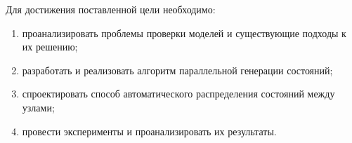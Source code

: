 Для достижения поставленной цели необходимо:
\begin{enumerate}
\item проанализировать проблемы проверки моделей и существующие подходы к их решению;
\item разработать и реализовать алгоритм параллельной генерации состояний;
\item спроектировать способ автоматического распределения состояний между узлами;
\item провести эксперименты и проанализировать их результаты.
\end{enumerate}


